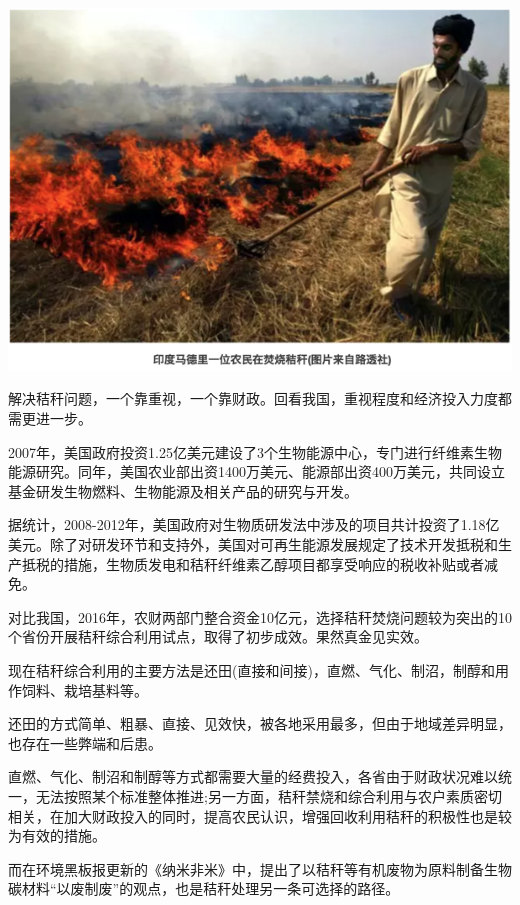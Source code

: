 \documentclass[
]{book}
\begin{document}
\includegraphics[width=8.33in]{images/stalk4}

解决秸秆问题，一个靠重视，一个靠财政。回看我国，重视程度和经济投入力度都需更进一步。

2007年，美国政府投资1.25亿美元建设了3个生物能源中心，专门进行纤维素生物能源研究。同年，美国农业部出资1400万美元、能源部出资400万美元，共同设立基金研发生物燃料、生物能源及相关产品的研究与开发。

据统计，2008-2012年，美国政府对生物质研发法中涉及的项目共计投资了1.18亿美元。除了对研发环节和支持外，美国对可再生能源发展规定了技术开发抵税和生产抵税的措施，生物质发电和秸秆纤维素乙醇项目都享受响应的税收补贴或者减免。

对比我国，2016年，农财两部门整合资金10亿元，选择秸秆焚烧问题较为突出的10个省份开展秸秆综合利用试点，取得了初步成效。果然真金见实效。

现在秸秆综合利用的主要方法是还田(直接和间接)，直燃、气化、制沼，制醇和用作饲料、栽培基料等。

还田的方式简单、粗暴、直接、见效快，被各地采用最多，但由于地域差异明显，也存在一些弊端和后患。

直燃、气化、制沼和制醇等方式都需要大量的经费投入，各省由于财政状况难以统一，无法按照某个标准整体推进;另一方面，秸秆禁烧和综合利用与农户素质密切相关，在加大财政投入的同时，提高农民认识，增强回收利用秸秆的积极性也是较为有效的措施。

而在环境黑板报更新的《纳米非米》中，提出了以秸秆等有机废物为原料制备生物碳材料``以废制废''的观点，也是秸秆处理另一条可选择的路径。
\end{document}
